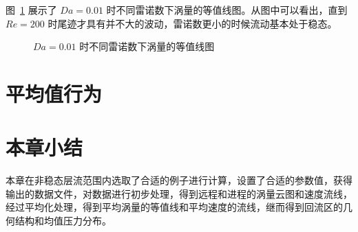 图~\ref{fig: vorticity-contour-1e-2} 展示了 $Da=0.01$ 时不同雷诺数下涡量的等值线图。从图中可以看出，直到 $Re=200$ 时尾迹才具有并不大的波动，雷诺数更小的时候流动基本处于稳态。

\begin{figure}
	\centering
	\begin{minipage}{\textwidth}
		\centering
	\end{minipage}
	\centering
	\begin{minipage}{\textwidth}
		\centering
	\end{minipage}
	\centering
	\begin{minipage}{\textwidth}
		\centering
	\end{minipage}
	\caption{$Da=0.01$ 时不同雷诺数下涡量的等值线图}
	\label{fig: vorticity-contour-1e-2}
\end{figure}

\section{平均值行为}\label{sec: average}

\section{本章小结}

本章在非稳态层流范围内选取了合适的例子进行计算，设置了合适的参数值，获得输出的数据文件，对数据进行初步处理，得到远程和进程的涡量云图和速度流线，经过平均化处理，得到平均涡量的等值线和平均速度的流线，继而得到回流区的几何结构和均值压力分布。
